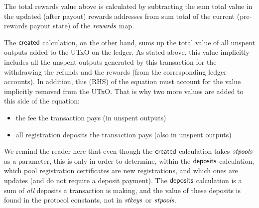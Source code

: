 \documentclass[11pt,a4paper,dvipsnames]{article}
\theoremstyle{definition}
\theoremstyle{definition}
\begin{document}
The total rewards value above is calculated by subtracting the sum total value in the
updated (after payout) rewards addresses from sum total of the current (pre-rewards
payout state) of the $\mathit{rewards}$ map.

The $\mathsf{created}$ calculation, on the other hand, sums up the total
value of all unspent outputs added to the UTxO on the ledger. As stated
above, this value implicitly includes all the unspent outputs generated
by this transaction for the withdrawing the refunds and the rewards
(from the corresponding ledger accounts). In addition, this (RHS) of the
equation must account for the value implicitly removed from the UTxO. That is why
two more values are added to this side of the equation:

\begin{itemize}
\item the fee the transaction pays (in unspent outputs)
\item all registration
deposits the transaction pays (also in unspent outputs)
\end{itemize}

We remind the reader here that even though the $\mathsf{created}$ calculation
takes $\mathit{stpools}$ as a parameter, this is only in order to determine,
within the $\mathsf{deposits}$ calculation, which
pool registration certificates are new registrations, and which ones are updates
(and do not require a deposit payment). The $\mathsf{deposits}$ calculation is
a sum of \textit{all} deposits a transaction is making, and the value of these
deposits is found in the protocol constants, not in $\mathit{stkeys}$ or $\mathit{stpools}$.
\end{document}
